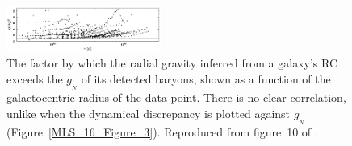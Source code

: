 \documentclass[fleqn,usenatbib,useAMS,onecolumn]{mnras} %
\begin{document}
\begin{figure}
	\centering
	\includegraphics[width=0.45\textwidth]{Famaey_McGaugh_2012_Figure_10_r}
	\caption{The factor by which the radial gravity inferred from a galaxy's RC exceeds the $g_{_N}$ of its detected baryons, shown as a function of the galactocentric radius of the data point. There is no clear correlation, unlike when the dynamical discrepancy is plotted against $g_{_N}$ (Figure~\ref{MLS_16_Figure_3}). Reproduced from figure~10 of \citet{Famaey_McGaugh_2012}.}
	\label{Famaey_McGaugh_2012_Figure_10_r}
\end{figure}
\end{document}

